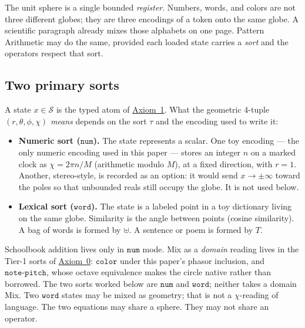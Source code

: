 \documentclass[12pt, a4paper]{article}
\begin{document}
The unit sphere is a single bounded \emph{register}.
Numbers, words, and colors are not three different globes; they are
three encodings of a token onto the same globe. A scientific paragraph
already mixes those alphabets on one page. Pattern Arithmetic may do
the same, provided each loaded state carries a \emph{sort} and the
operators respect that sort.

\subsection{Two primary sorts}
\label{subsec:sorts}
A state $x\in\mathcal{S}$ is the typed atom of
\hyperref[subsec:axiom1]{Axiom~1}. What the geometric 4-tuple
$(r,\theta,\phi,\chi)$ \emph{means} depends on the sort $\tau$ and the
encoding used to write it:
\begin{itemize}
    \item \textbf{Numeric sort ($\mathtt{num}$).}
          The state represents a scalar. One toy encoding --- the only
          numeric encoding used in this paper --- stores an
          integer $n$ on a marked clock as
          $\chi = 2\pi n/M$ (arithmetic modulo $M$), at a fixed
          direction, with $r=1$.
          Another, stereo-style, is recorded as an option: it would
          send $x\to\pm\infty$ toward the
          poles so that unbounded reals still occupy the globe. It is
          not used below.
    \item \textbf{Lexical sort ($\mathtt{word}$).}
          The state is a labeled point in a toy dictionary living on
          the same globe. Similarity is the angle between points
          (cosine similarity). A bag of words is formed by $\uplus$.
          A sentence or poem is formed by $T$.
\end{itemize}
Schoolbook addition lives only in $\mathtt{num}$ mode.
Mix as a \emph{domain} reading lives in the Tier-1 sorts of
\hyperref[subsec:axiom0_admissibility]{Axiom~0}: $\mathtt{color}$ under this
paper's phasor inclusion, and $\mathtt{note\text{-}pitch}$, whose
octave equivalence makes the circle native rather than borrowed.
The two sorts worked below are $\mathtt{num}$ and $\mathtt{word}$;
neither takes a domain Mix.
Two $\mathtt{word}$ states may be mixed as geometry; that is not a
$\chi$-reading of language. The two equations may share a sphere.
They may not share an operator.
\end{document}
